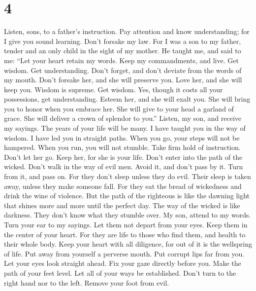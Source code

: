 \hypertarget{section-3}{%
\section{4}\label{section-3}}

 Listen, sons, to a father's instruction. Pay attention
and know understanding;  for I give you sound learning.
Don't forsake my law.  For I was a son to my father,
tender and an only child in the sight of my mother.  He
taught me, and said to me: ``Let your heart retain my words. Keep my
commandments, and live.  Get wisdom. Get understanding.
Don't forget, and don't deviate from the words of my mouth.
 Don't forsake her, and she will preserve you. Love her,
and she will keep you.  Wisdom is supreme. Get wisdom.
Yes, though it costs all your possessions, get understanding.
 Esteem her, and she will exalt you. She will bring you to
honor when you embrace her.  She will give to your head a
garland of grace. She will deliver a crown of splendor to you.''
 Listen, my son, and receive my sayings. The years of
your life will be many.  I have taught you in the way of
wisdom. I have led you in straight paths.  When you go,
your steps will not be hampered. When you run, you will not stumble.
 Take firm hold of instruction. Don't let her go. Keep
her, for she is your life.  Don't enter into the path of
the wicked. Don't walk in the way of evil men.  Avoid it,
and don't pass by it. Turn from it, and pass on.  For
they don't sleep unless they do evil. Their sleep is taken away, unless
they make someone fall.  For they eat the bread of
wickedness and drink the wine of violence.  But the path
of the righteous is like the dawning light that shines more and more
until the perfect day.  The way of the wicked is like
darkness. They don't know what they stumble over.  My
son, attend to my words. Turn your ear to my sayings. 
Let them not depart from your eyes. Keep them in the center of your
heart.  For they are life to those who find them, and
health to their whole body.  Keep your heart with all
diligence, for out of it is the wellspring of life.  Put
away from yourself a perverse mouth. Put corrupt lips far from you.
 Let your eyes look straight ahead. Fix your gaze
directly before you.  Make the path of your feet level.
Let all of your ways be established.  Don't turn to the
right hand nor to the left. Remove your foot from evil.


